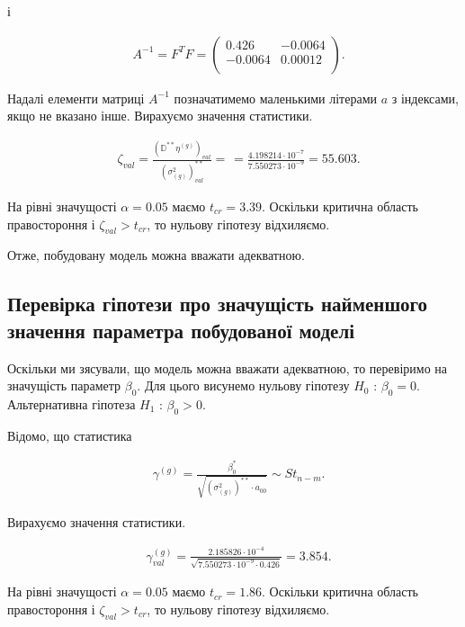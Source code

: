 \documentclass[14pt,a4paper]{scrartcl}
\theoremstyle{definition}
\theoremstyle{remark}
\theoremstyle{definition}
\theoremstyle{definition}
\begin{document}
і

\begin{align*}
  & A^{-1} = F^{T}F = \begin{pmatrix}
    0.426 & -0.0064 \\
    -0.0064 & 0.00012  \\
  \end{pmatrix}.
\end{align*}

Надалі елементи матриці $A^{-1}$ позначатимемо маленькими літерами $a$ з індексами, якщо не вказано інше. Вирахуємо значення статистики.

\begin{align*}
  & \zeta_{val} = \frac{(\mathbb{D}^{**}\eta^{(g)})_{val}}{(\sigma_{(g)}^2)^{**}_{val}} = \frac{}{} = \frac{4.198214 \cdot 10^{-7}}{7.550273 \cdot 10^{-9}} = 55.603.
\end{align*}

На рівні значущості $\alpha = 0.05$ маємо $t_{cr} = 3.39$. Оскільки критична область правостороння і $\zeta_{val} > t_{cr}$, то нульову гіпотезу відхиляємо.

Отже, побудовану модель можна вважати адекватною.

\subsection{Перевірка гіпотези про значущість найменшого значення параметра побудованої моделі}

Оскільки ми з\textquotesingle ясували, що модель можна вважати адекватною, то перевіримо на значущість параметр $\beta_{0}$. Для цього висунемо нульову гіпотезу $H_{0}$ : $\beta_{0} = 0$. Альтернативна гіпотеза $H_{1}$ : $\beta_{0} > 0$.

Відомо, що статистика

\begin{align*}
  & \gamma^{(g)} = \frac{\beta_{0}^{*}}{\sqrt{(\sigma_{(g)}^2)^{**}\cdot a_{00}}} \sim St_{n - m}.
\end{align*}

Вирахуємо значення статистики.

\begin{align*}
  & \gamma^{(g)}_{val} = \frac{2.185826 \cdot 10^{-4}}{\sqrt{7.550273 \cdot 10^{-9} \cdot 0.426}} = 3.854.
\end{align*}

На рівні значущості $\alpha = 0.05$ маємо $t_{cr} = 1.86$. Оскільки критична область правостороння і $\zeta_{val} > t_{cr}$, то нульову гіпотезу відхиляємо.
\end{document}
